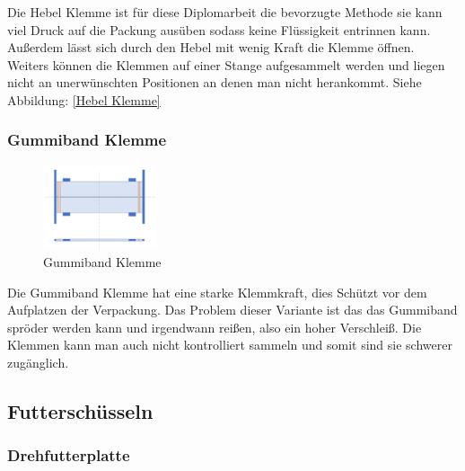Die Hebel Klemme ist für diese Diplomarbeit die bevorzugte Methode sie kann viel Druck auf die Packung ausüben sodass keine Flüssigkeit entrinnen kann. Außerdem lässt sich durch den Hebel mit wenig Kraft die Klemme öffnen. Weiters können die Klemmen auf einer Stange aufgesammelt werden und liegen nicht an unerwünschten Positionen an denen man nicht herankommt. Siehe Abbildung:    
 \ref{Hebel Klemme}
 \vspace{40pt}


\subsubsection{Gummiband Klemme}
 
\begin{figure}
\vspace{-40pt}
  \begin{center}
    \includegraphics[width=0.30\textwidth]{Bilder/Powerpoint/Gummiband_Klemme}
  \end{center}
  \caption{Gummiband Klemme}
  \label{Gummiband Klemme}
  \vspace{-20pt}
\end{figure}

Die Gummiband Klemme hat eine starke Klemmkraft, dies Schützt vor dem Aufplatzen der Verpackung. Das Problem dieser Variante ist das das Gummiband spröder werden kann und irgendwann reißen, also ein hoher Verschleiß. Die Klemmen kann man auch nicht kontrolliert sammeln und somit sind sie schwerer zugänglich.

\subsection{Futterschüsseln}

\subsubsection{Drehfutterplatte}

